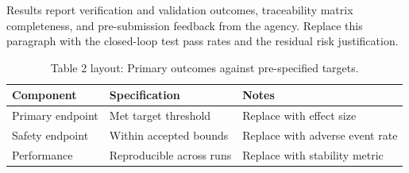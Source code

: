 
Results report verification and validation outcomes, traceability matrix completeness, and pre-submission feedback from the agency. Replace this paragraph with the closed-loop test pass rates and the residual risk justification.

\begin{table}[H]
\caption{Table 2 layout: Primary outcomes against pre-specified targets.}
\label{tab:results_primary}
\centering
\begin{tabular}{>{\raggedright\arraybackslash}p{3.4cm} >{\raggedright\arraybackslash}p{4.6cm} >{\raggedright\arraybackslash}p{5.4cm}}
\toprule
\textbf{Component} & \textbf{Specification} & \textbf{Notes} \\
\midrule
  Primary endpoint & Met target threshold & Replace with effect size \\
  Safety endpoint & Within accepted bounds & Replace with adverse event rate \\
  Performance & Reproducible across runs & Replace with stability metric \\
\bottomrule
\end{tabular}
\end{table}
